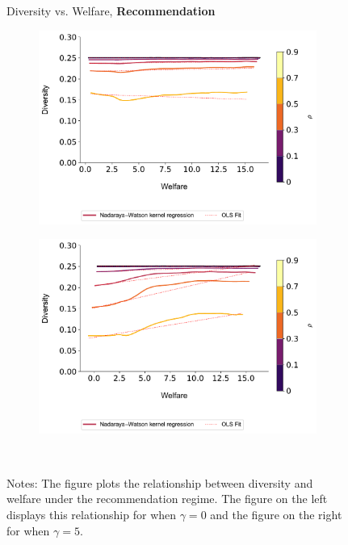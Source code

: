 \documentclass[format=acmsmall, review=false]{acmart}
\begin{document}
\addtocounter{figure}{-1}
\begin{figure}[ht]
\caption{Diversity vs. Welfare, \textbf{Recommendation}}
\begin{subfigure}{.45\textwidth}
\includegraphics[width=1.0\linewidth]{figures/diversity_welfare_rn_partial_n_200.pdf}
\end{subfigure}
\begin{subfigure}{.45\textwidth}
\includegraphics[width=1.0\linewidth]{figures/diversity_welfare_ra_partial_n_200.pdf}
\end{subfigure}\\
\caption*{\scriptsize Notes: The figure plots the relationship between diversity and welfare under the recommendation regime. The figure on the left displays this relationship for when $\gamma = 0$ and the figure on the right for when $\gamma = 5$.}\label{fig:diversity_welfare_ra_partial}
\end{figure}
\addtocounter{figure}{-1}
\end{document}
